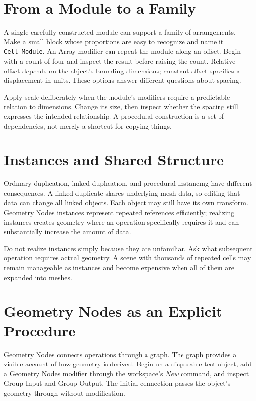 \documentclass[11pt,openany]{book}
\newcommand{\obj}[1]{\texttt{#1}}
\begin{document}
\section{From a Module to a Family}

A single carefully constructed module can support a family of arrangements. Make a small block whose proportions are easy to recognize and name it \obj{Cell\_Module}. An Array modifier can repeat the module along an offset. Begin with a count of four and inspect the result before raising the count. Relative offset depends on the object's bounding dimensions; constant offset specifies a displacement in units. These options answer different questions about spacing.

Apply scale deliberately when the module's modifiers require a predictable relation to dimensions. Change its size, then inspect whether the spacing still expresses the intended relationship. A procedural construction is a set of dependencies, not merely a shortcut for copying things.

\section{Instances and Shared Structure}

Ordinary duplication, linked duplication, and procedural instancing have different consequences. A linked duplicate shares underlying mesh data, so editing that data can change all linked objects. Each object may still have its own transform. Geometry Nodes instances represent repeated references efficiently; realizing instances creates geometry where an operation specifically requires it and can substantially increase the amount of data.

Do not realize instances simply because they are unfamiliar. Ask what subsequent operation requires actual geometry. A scene with thousands of repeated cells may remain manageable as instances and become expensive when all of them are expanded into meshes.

\section{Geometry Nodes as an Explicit Procedure}

Geometry Nodes connects operations through a graph. The graph provides a visible account of how geometry is derived. Begin on a disposable test object, add a Geometry Nodes modifier through the workspace's \emph{New} command, and inspect Group Input and Group Output. The initial connection passes the object's geometry through without modification.
\end{document}

